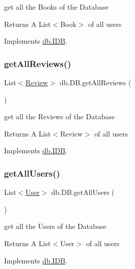 get all the Books of the Database \begin{DoxyReturn}{Returns}
A List$<$\+Book$>$ of all users 
\end{DoxyReturn}


Implements \hyperlink{interfacedb_1_1_i_d_b_abd0d41674bbcdd524a3ca2403504bf25}{db.\+I\+DB}.

\mbox{\label{classdb_1_1_d_b_ac7a84c5621f4ad2263cd830dbf10842e}} 
\subsubsection{\texorpdfstring{get\+All\+Reviews()}{getAllReviews()}}
{\footnotesize\ttfamily List$<$\hyperlink{classserver_1_1data_1_1_review}{Review}$>$ db.\+D\+B.\+get\+All\+Reviews (\begin{DoxyParamCaption}{ }\end{DoxyParamCaption})}

get all the Reviews of the Database \begin{DoxyReturn}{Returns}
A List$<$\+Review$>$ of all users 
\end{DoxyReturn}


Implements \hyperlink{interfacedb_1_1_i_d_b_a08f60c8b923599c650f04b4192d00d55}{db.\+I\+DB}.

\mbox{\label{classdb_1_1_d_b_ad02e4c78f9afe64af34fb2e5889ce501}} 
\subsubsection{\texorpdfstring{get\+All\+Users()}{getAllUsers()}}
{\footnotesize\ttfamily List$<$\hyperlink{classserver_1_1data_1_1_user}{User}$>$ db.\+D\+B.\+get\+All\+Users (\begin{DoxyParamCaption}{ }\end{DoxyParamCaption})}

get all the Users of the Database \begin{DoxyReturn}{Returns}
A List$<$\+User$>$ of all users 
\end{DoxyReturn}


Implements \hyperlink{interfacedb_1_1_i_d_b_a39ad15619eae3d0ec652e1849e3ebd50}{db.\+I\+DB}.

